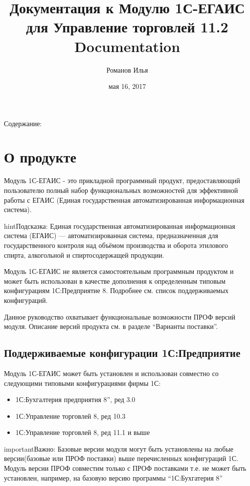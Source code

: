 \documentclass[letterpaper,10pt,russian]{sphinxmanual}
\title{Документация к Модулю 1С-ЕГАИС для Управление торговлей 11.2 Documentation}
\date{мая 16, 2017}
\author{Романов Илья}
\begin{document}
\maketitle
\tableofcontents
{}\label{index::doc}


Содержание:


\chapter{О продукте}
\label{intro::doc}\label{intro:id1}
Модуль 1С-ЕГАИС - это прикладной программный продукт, предоставляющий пользователю полный набор функциональных возможностей для эффективной работы с \textsc{ЕГАИС} (Единая государственная автоматизированная информационная система).

\begin{notice}{hint}{Подсказка:}
Единая государственная автоматизированная информационная система (ЕГАИС) — автоматизированная система, предназначенная для государственного контроля над объёмом производства и оборота этилового спирта, алкогольной и спиртосодержащей продукции.
\end{notice}

Модуль 1С-ЕГАИС не является самостоятельным программным продуктом и может быть использован в качестве дополнения к определенным типовым конфигурациям 1С:Предприятие 8. Подробнее см. список поддерживаемых конфигураций.

Данное руководство охватывает функциональные возможности ПРОФ версий модуля. Описание версий продукта см. в разделе ``Варианты поставки''.


\section{Поддерживаемые конфигурации 1С:Предприятие}
\label{intro:id2}
Модуль 1С-ЕГАИС может быть установлен и использован совместно со следующими типовыми конфигурациями фирмы 1С:
\begin{itemize}
\item {} 
1С:Бухгалтерия предприятия 8'', ред 3.0

\item {} 
1С:Управление торговлей 8, ред 10.3

\item {} 
1С:Управление торговлей 8, ред 11.1 и выше

\end{itemize}

\begin{notice}{important}{Важно:}
Базовые версии модуля могут быть установлены на любые версии(базовые или ПРОФ поставки) выше перечисленных конфигураций 1С. Модуль версии ПРОФ совместим только с ПРОФ поставками т.е. не может быть установлен, например, на базовую версию программы ``1С:Бухгатерия 8''
\end{notice}
\end{document}
